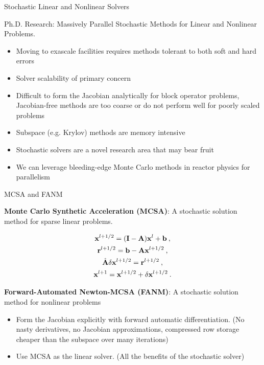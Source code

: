 \documentclass{beamer}
\newcommand{\vA}{\ensuremath{\ve{A}}}
\newcommand{\vb}{\ensuremath{\ve{b}}}
\newcommand{\vx}{\ensuremath{\ve{x}}}
\newcommand{\vr}{\ensuremath{\ve{r}}}
\newcommand{\vI}{\ensuremath{\ve{I}}}
\begin{document}
\begin{frame}{Stochastic Linear and Nonlinear Solvers}

  Ph.D. Research: Massively Parallel Stochastic Methods for Linear and
  Nonlinear Problems.

  \begin{itemize}
  \item Moving to exascale facilities requires methods tolerant to
    both soft and hard errors
  \item Solver scalability of primary concern
  \item Difficult to form the Jacobian analytically for block operator
    problems, Jacobian-free methods are too coarse or do not perform
    well for poorly scaled problems
  \item Subspace (e.g. Krylov) methods are memory intensive
  \item Stochastic solvers are a novel research area that may bear
    fruit
  \item We can leverage bleeding-edge Monte Carlo methods in reactor
    physics for parallelism
  \end{itemize}

\end{frame}

\begin{frame}{MCSA and FANM}

  \textbf{Monte Carlo Synthetic Acceleration (MCSA)}: A stochastic
  solution method for sparse linear problems.

  \begin{subequations}
    \label{eq:MCSA-iteration}
    \begin{gather}
      \vx^{l+1/2} = (\vI - \vA)\vx^l + \vb\:,\\ \vr^{l+1/2} = \vb -
      \vA\vx^{l+1/2}\:,
      \label{eq:MCSA-residual}\\     
      \hat{\vA}\delta\vx^{l+1/2} = \vr^{l+1/2}\:,
      \label{eq:MCSA-residual_solve}\\ 
      \vx^{l+1}=\vx^{l+1/2}+\delta\vx^{l+1/2}\:.
    \end{gather}
  \end{subequations}

  \textbf{Forward-Automated Newton-MCSA (FANM)}: A stochastic solution
  method for nonlinear problems

  \begin{itemize}
  \item Form the Jacobian explicitly with forward automatic
    differentiation. (No nasty derivatives, no Jacobian
    approximations, compressed row storage cheaper than the subspace
    over many iterations)
  \item Use MCSA as the linear solver. (All the benefits of the
    stochastic solver)
  \end{itemize}

\end{frame}
\end{document}
